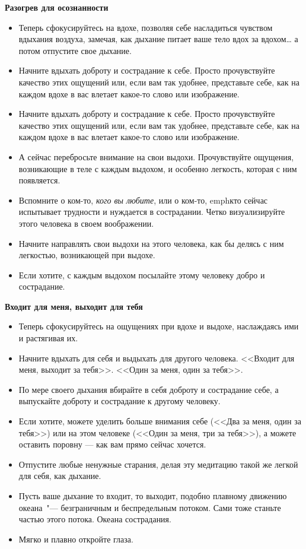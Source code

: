 {\large \textbf{Разогрев для осознанности}}
\begin{itemize}
	\item Теперь сфокусируйтесь на вдохе, позволяя себе насладиться чувством вдыхания воздуха, замечая, как дыхание питает ваше тело вдох за вдохом… а потом отпустите свое дыхание.
	\item Начните вдыхать доброту и сострадание к себе. Просто прочувствуйте качество этих ощущений или, если вам так удобнее, представьте себе, как на каждом вдохе в вас влетает какое-то слово или изображение.
	\item Начните вдыхать доброту и сострадание к себе. Просто прочувствуйте качество этих ощущений или, если вам так удобнее, представьте себе, как на каждом вдохе в вас влетает какое-то слово или изображение.
	\item А сейчас перебросьте внимание на свои выдохи. Прочувствуйте ощущения, возникающие в теле с каждым выдохом, и особенно легкость, которая с ним появляется.
	\item Вспомните о ком-то, \emph{кого вы любите}, или о ком-то, emph{кто сейчас испытывает трудности} и нуждается в сострадании. Четко визуализируйте этого человека в своем воображении.
	\item Начните направлять свои выдохи на этого человека, как бы делясь с ним легкостью, возникающей при выдохе.
	\item Если хотите, с каждым выдохом посылайте этому человеку добро и сострадание.
\end{itemize}

\vspace{2ex}

{\large \textbf{Входит для меня, выходит для тебя}}
\begin{itemize}
	\item Теперь сфокусируйтесь на ощущениях при вдохе и выдохе, наслаждаясь ими и растягивая их.
	\item Начните вдыхать для себя и выдыхать для другого человека. <<Входит для меня, выходит за тебя>>. <<Один за меня, один за тебя>>.
	\item По мере своего дыхания вбирайте в себя доброту и сострадание себе, а выпускайте доброту и сострадание к другому человеку.
	\item Если хотите, можете уделить больше внимания себе (<<Два за меня, один за тебя>>) или на этом человеке (<<Один за меня, три за тебя>>), а можете оставить поровну — как вам прямо сейчас хочется.
	\item Отпустите любые ненужные старания, делая эту медитацию такой же легкой для себя, как дыхание.
	\item Пусть ваше дыхание то входит, то выходит, подобно плавному движению океана~"--- безграничным и беспредельным потоком. Сами тоже станьте частью этого потока. Океана сострадания.
	\item Мягко и плавно откройте глаза.
\end{itemize}

